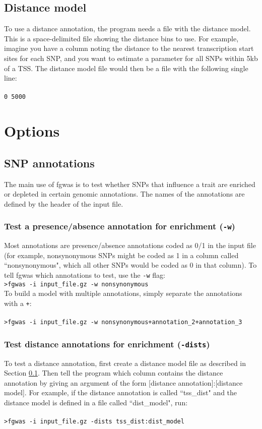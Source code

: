 \documentclass[11pt,titlepage]{article}
\begin{document}
\subsection{Distance model} \label{dist_input}
To use a distance annotation, the program needs a file with the distance model. This is a space-delimited file showing the distance bins to use. For example, imagine you have a column noting the distance to the nearest transcription start sites for each SNP, and you want to estimate a parameter for all SNPs within 5kb of a TSS. The distance model file would then be a file with the following single line:
\\
\\
\noindent \texttt{0 5000} \\
\section{Options}
\subsection{SNP annotations}
The main use of fgwas is to test whether SNPs that influence a trait are enriched or depleted in certain genomic annotations. The names of the annotations are defined by the header of the input file.
\subsubsection{Test a presence/absence annotation for enrichment (\texttt{-w})}
Most annotations are presence/absence annotations coded as 0/1 in the input file (for example, nonsynonymous SNPs might be coded as 1 in a column called ``nonsynonymous", which all other SNPs would be coded as 0 in that column). To tell fgwas which annotations to test, use the \texttt{-w} flag:\\

\noindent \texttt{>fgwas -i input\_file.gz -w nonsynonymous}\\

\noindent To build a model with multiple annotations, simply separate the annotations with a \texttt{+}:
\\
\\
\noindent \texttt{>fgwas -i input\_file.gz -w nonsynonymous+annotation\_2+annotation\_3}

\subsubsection{Test distance annotations for enrichment (\texttt{-dists})}
To test a distance annotation, first create a distance model file as described in Section \ref{dist_input}. Then tell the program which column contains the distance annotation by giving an argument of the form [distance annotation]:[distance model]. For example, if the distance annotation is called ``tss\_dist" and the distance model is defined in a file called ``dist\_model", run:\\
\\
\noindent \texttt{>fgwas -i input\_file.gz -dists tss\_dist:dist\_model}\\
\end{document}
